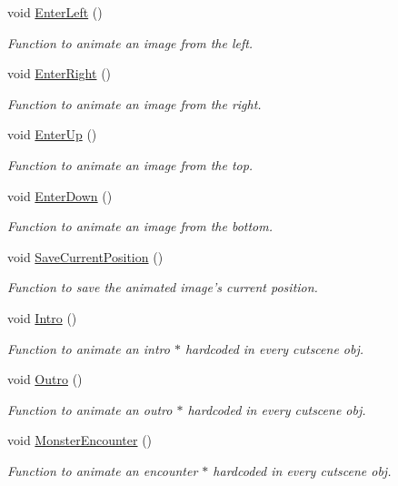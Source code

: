 \begin{DoxyCompactItemize}
void \hyperlink{classCutscene_a2d6e392b1db205cfbd723058f14f59c1}{Enter\-Left} ()
\begin{DoxyCompactList}\small\item\em Function to animate an image from the left. \end{DoxyCompactList}\item 
void \hyperlink{classCutscene_abbaa7bd2dbc23156535a9e7e88963e2e}{Enter\-Right} ()
\begin{DoxyCompactList}\small\item\em Function to animate an image from the right. \end{DoxyCompactList}\item 
void \hyperlink{classCutscene_aa6ad0c95cba437bb00beabd62e38cd57}{Enter\-Up} ()
\begin{DoxyCompactList}\small\item\em Function to animate an image from the top. \end{DoxyCompactList}\item 
void \hyperlink{classCutscene_ad04e97591b314ad3808acc28d31c63d5}{Enter\-Down} ()
\begin{DoxyCompactList}\small\item\em Function to animate an image from the bottom. \end{DoxyCompactList}\item 
void \hyperlink{classCutscene_aa8d16210b44e11bf95363327461c28ed}{Save\-Current\-Position} ()
\begin{DoxyCompactList}\small\item\em Function to save the animated image's current position. \end{DoxyCompactList}\item 
void \hyperlink{classCutscene_aeb7422fbe04520b9bcdceebc9c69b1b5}{Intro} ()
\begin{DoxyCompactList}\small\item\em Function to animate an intro $\ast$ hardcoded in every cutscene obj. \end{DoxyCompactList}\item 
void \hyperlink{classCutscene_a6af4b8c23f0934cc2909221c850e0d2a}{Outro} ()
\begin{DoxyCompactList}\small\item\em Function to animate an outro $\ast$ hardcoded in every cutscene obj. \end{DoxyCompactList}\item 
void \hyperlink{classCutscene_aa67a9025d464aff2e5814cbb0f5bf07e}{Monster\-Encounter} ()
\begin{DoxyCompactList}\small\item\em Function to animate an encounter $\ast$ hardcoded in every cutscene obj. \end{DoxyCompactList}\end{DoxyCompactItemize}

